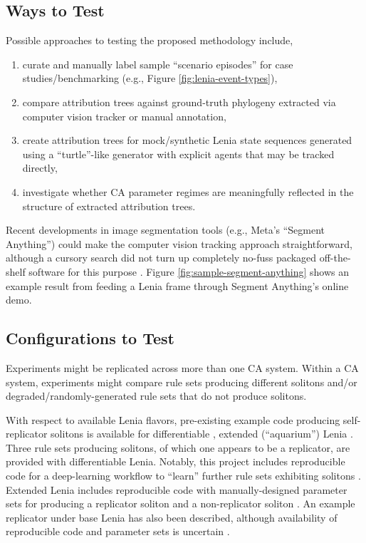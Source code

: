\subsection{Ways to Test}

Possible approaches to testing the proposed methodology include,
\begin{enumerate}
\item curate and manually label sample ``scenario episodes'' for case studies/benchmarking (e.g., Figure \ref{fig:lenia-event-types}),
\item compare attribution trees against ground-truth phylogeny extracted via computer vision tracker or manual annotation,
\item create attribution trees for mock/synthetic Lenia state sequences generated using a ``turtle''-like generator with explicit agents that may be tracked directly,
\item investigate whether CA parameter regimes are meaningfully reflected in the structure of extracted attribution trees.
\end{enumerate}



Recent developments in image segmentation tools (e.g., Meta's ``Segment Anything'') could make the computer vision tracking approach straightforward, although a cursory search did not turn up completely no-fuss packaged off-the-shelf software for this purpose \citep{cheng2023segment,yang2023track,kirillov2023segment}.
Figure \ref{fig:sample-segment-anything} shows an example result from feeding a Lenia frame through Segment Anything's online demo.

\subsection{Configurations to Test}

Experiments might be replicated across more than one CA system.
Within a CA system, experiments might compare rule sets producing different solitons and/or degraded/randomly-generated rule sets that do not produce solitons.

With respect to available Lenia flavors, pre-existing example code producing self-replicator solitons is available for differentiable \citep{hamon2022learning}, extended (``aquarium'') Lenia \citep{chan2020lenia}.
Three rule sets producing solitons, of which one appears to be a replicator, are provided with differentiable Lenia.
Notably, this project includes reproducible code for a deep-learning workflow to ``learn'' further rule sets exhibiting solitons \citep{hamon2022learning}.
Extended Lenia includes reproducible code with manually-designed parameter sets for producing a replicator soliton and a non-replicator soliton \citep{chan2020lenia}.
An example replicator under base Lenia has also been described, although availability of reproducible code and parameter sets is uncertain \citep{chan2019lenia}.

